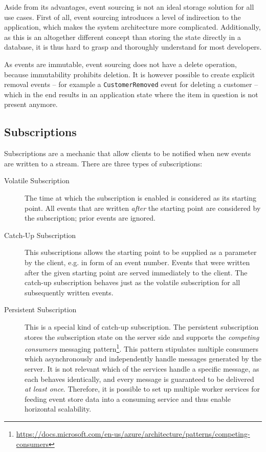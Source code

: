 Aside from its advantages, event sourcing is not an ideal storage solution for all use cases.
First of all, event sourcing introduces a level of indirection to the application, which makes the system architecture more complicated.
Additionally, as this is an altogether different concept than storing the state directly in a database, it is thus hard to grasp and thoroughly understand for most developers.


As events are immutable, event sourcing does not have a delete operation, because immutability prohibits deletion.
It is however possible to create explicit removal events -- for example a \texttt{CustomerRemoved} event for deleting a customer -- which in the end results in an application state where the item in question is not present anymore.

\cite{WEB:Fowler:2011}


\subsection{Subscriptions}

Subscriptions are a mechanic that allow clients to be notified when new events are written to a stream.
There are three types of subscriptions:

\begin{description}
\item[Volatile Subscription]
The time at which the subscription is enabled is considered as its starting point.
All events that are written \emph{after} the starting point are considered by the subscription; prior events are ignored.
\item[Catch-Up Subscription]
This subscriptions allows the starting point to be supplied as a parameter by the client, e.g. in form of an event number.
Events that were written after the given starting point are served immediately to the client.
The catch-up subscription behaves just as the volatile subscription for all subsequently written events.
\item[Persistent Subscription] 
This is a special kind of catch-up subscription.
The persistent subscription stores the subscription state on the server side and supports the \emph{competing consumers} messaging pattern\footnote{\url{https://docs.microsoft.com/en-us/azure/architecture/patterns/competing-consumers}}.
This pattern stipulates multiple consumers which asynchronously and independently handle messages generated by the server.
It is not relevant which of the services handle a specific message, as each behaves identically, and every message is guaranteed to be delivered \emph{at least once}.
Therefore, it is possible to set up multiple worker services for feeding event store data into a consuming service and thus enable horizontal scalability.
\end{description}


